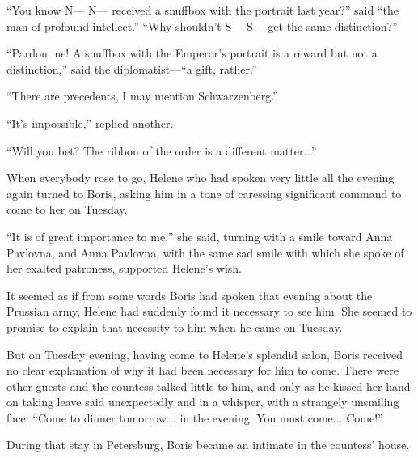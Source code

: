 ``You know N--- N--- received a snuffbox with the portrait last
year?'' said ``the man of profound intellect.'' ``Why shouldn't
S--- S--- get the same distinction?''

``Pardon me! A snuffbox with the Emperor's portrait is a reward
but not a distinction,'' said the diplomatist---``a gift,
rather.''

``There are precedents, I may mention Schwarzenberg.''

``It's impossible,'' replied another.

``Will you bet? The ribbon of the order is a different
matter...''

When everybody rose to go, Helene who had spoken very little all
the evening again turned to Boris, asking him in a tone of
caressing significant command to come to her on Tuesday.

``It is of great importance to me,'' she said, turning with a
smile toward Anna Pavlovna, and Anna Pavlovna, with the same sad
smile with which she spoke of her exalted patroness, supported
Helene's wish.

It seemed as if from some words Boris had spoken that evening
about the Prussian army, Helene had suddenly found it necessary
to see him. She seemed to promise to explain that necessity to
him when he came on Tuesday.

But on Tuesday evening, having come to Helene's splendid salon,
Boris received no clear explanation of why it had been necessary
for him to come. There were other guests and the countess talked
little to him, and only as he kissed her hand on taking leave
said unexpectedly and in a whisper, with a strangely unsmiling
face: ``Come to dinner tomorrow... in the evening. You must
come... Come!''

During that stay in Petersburg, Boris became an intimate in the
countess' house.


